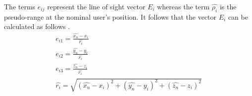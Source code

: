 The terms $e_{ij}$ represent the line of sight vector $E_i$ whereas the term $\hat{\rho_i}$ is the pseudo-range at the nominal user's position. It follows that the vector $E_i$ can be calculated as follows \cite{jwo2001efficient}.
\begin{subequations}
                \begin{align}
                    e_{i1} = \frac{\hat{x_n} - x_i}{\hat{r_i}}\\
                    e_{i2} = \frac{\hat{y_n} - y_i}{\hat{r_i}}\\
                    e_{i3} = \frac{\hat{z_n} - z_i}{\hat{r_i}}\\
                    \hat{r_i} = \sqrt{(\hat{x_n} - x_i)^2+(\hat{y_n} -y_i)^2+(\hat{z_n} -z_i)^2}
                \end{align}
\end{subequations}

